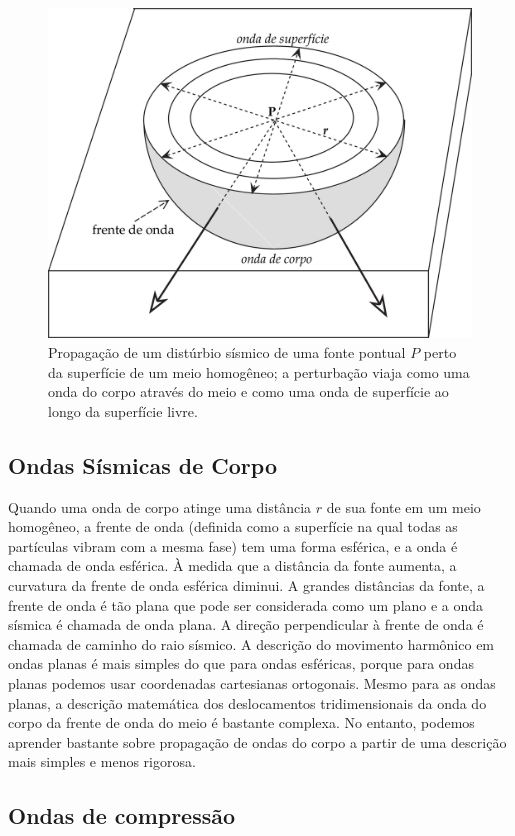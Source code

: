 \documentclass[]{book}
\theoremstyle{definition}
\theoremstyle{definition}
\theoremstyle{definition}
\theoremstyle{remark}
\begin{document}
\begin{figure}

{\centering \includegraphics[width=0.6\linewidth]{fig/Fig_03.09} 

}

\caption{Propagação de um distúrbio sísmico de uma fonte pontual $P$ perto da superfície de um meio homogêneo; a perturbação viaja como uma onda do corpo através do meio e como uma onda de superfície ao longo da superfície livre.}\label{fig:propagacao}
\end{figure}

\hypertarget{ondas-sismicas-de-corpo}{%
\subsection{Ondas Sísmicas de Corpo}\label{ondas-sismicas-de-corpo}}

Quando uma onda de corpo atinge uma distância \({r}\) de sua fonte em um meio homogêneo, a frente de onda (definida como a superfície na qual todas as partículas vibram com a mesma fase) tem uma forma esférica, e a onda é chamada de onda esférica. À medida que a distância da fonte aumenta, a curvatura da frente de onda esférica diminui. A grandes distâncias da fonte, a frente de onda é tão plana que pode ser considerada como um plano e a onda sísmica é chamada de onda plana. A direção perpendicular à frente de onda é chamada de caminho do raio sísmico. A descrição do movimento harmônico em ondas planas é mais simples do que para ondas esféricas, porque para ondas planas podemos usar coordenadas cartesianas ortogonais. Mesmo para as ondas planas, a descrição matemática dos deslocamentos tridimensionais da onda do corpo da frente de onda do meio é bastante complexa. No entanto, podemos aprender bastante sobre propagação de ondas do corpo a partir de uma descrição mais simples e menos rigorosa.

\hypertarget{ondas-de-compressao}{%
\subsection{Ondas de compressão}\label{ondas-de-compressao}}
\end{document}
